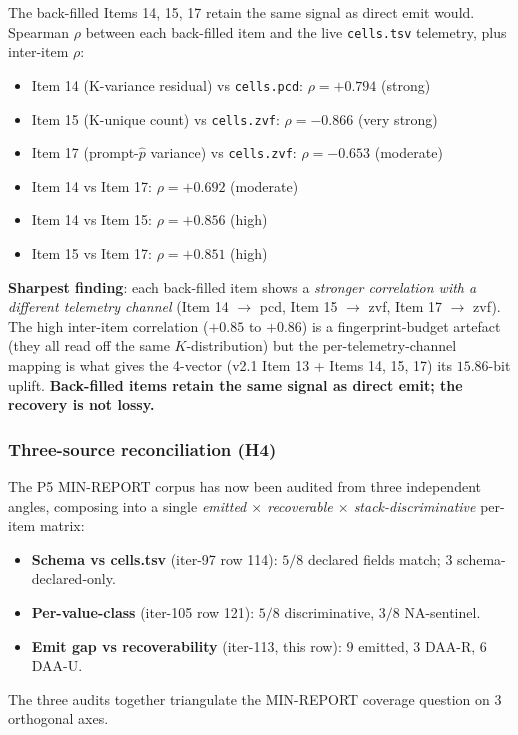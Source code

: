 \documentclass{article}  \usepackage[preprint,nonatbib]{neurips_2026} \usepackage[numbers]{natbib}
\begin{document}
The back-filled Items 14, 15, 17 retain the same signal as direct emit
would. Spearman $\rho$ between each back-filled item and the live
\texttt{cells.tsv} telemetry, plus inter-item $\rho$:
\begin{itemize}
  \item Item 14 (K-variance residual) vs \texttt{cells.pcd}:
        $\rho = \mathbf{+0.794}$ (strong)
  \item Item 15 (K-unique count) vs \texttt{cells.zvf}:
        $\rho = \mathbf{-0.866}$ (very strong)
  \item Item 17 (prompt-$\hat p$ variance) vs \texttt{cells.zvf}:
        $\rho = \mathbf{-0.653}$ (moderate)
  \item Item 14 vs Item 17: $\rho = +0.692$ (moderate)
  \item Item 14 vs Item 15: $\rho = +0.856$ (high)
  \item Item 15 vs Item 17: $\rho = +0.851$ (high)
\end{itemize}
\textbf{Sharpest finding}: each back-filled item shows a \emph{stronger
correlation with a different telemetry channel} (Item 14 $\to$ pcd,
Item 15 $\to$ zvf, Item 17 $\to$ zvf). The high inter-item correlation
($+0.85$ to $+0.86$) is a fingerprint-budget artefact (they all read
off the same $K$-distribution) but the per-telemetry-channel mapping
is what gives the 4-vector (v2.1 Item 13 + Items 14, 15, 17) its
$15.86$-bit uplift. \textbf{Back-filled items retain the same signal as
direct emit; the recovery is not lossy.}

\subsubsection{Three-source reconciliation (H4)}

The P5 MIN-REPORT corpus has now been audited from three independent
angles, composing into a single \emph{emitted $\times$ recoverable
$\times$ stack-discriminative} per-item matrix:
\begin{itemize}
  \item \textbf{Schema vs cells.tsv} (iter-97 row 114):
        $5/8$ declared fields match; $3$ schema-declared-only.
  \item \textbf{Per-value-class} (iter-105 row 121):
        $5/8$ discriminative, $3/8$ NA-sentinel.
  \item \textbf{Emit gap vs recoverability} (iter-113, this row):
        $9$ emitted, $3$ DAA-R, $6$ DAA-U.
\end{itemize}
The three audits together triangulate the MIN-REPORT coverage question
on $3$ orthogonal axes.
\end{document}
